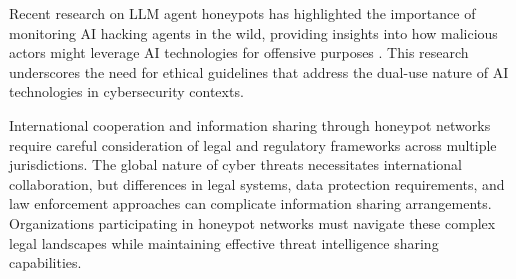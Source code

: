 Recent research on LLM agent honeypots has highlighted the importance of monitoring AI hacking agents in the wild, providing insights into how malicious actors might leverage AI technologies for offensive purposes \cite{reworr2024}. This research underscores the need for ethical guidelines that address the dual-use nature of AI technologies in cybersecurity contexts.

International cooperation and information sharing through honeypot networks require careful consideration of legal and regulatory frameworks across multiple jurisdictions. The global nature of cyber threats necessitates international collaboration, but differences in legal systems, data protection requirements, and law enforcement approaches can complicate information sharing arrangements. Organizations participating in honeypot networks must navigate these complex legal landscapes while maintaining effective threat intelligence sharing capabilities.
